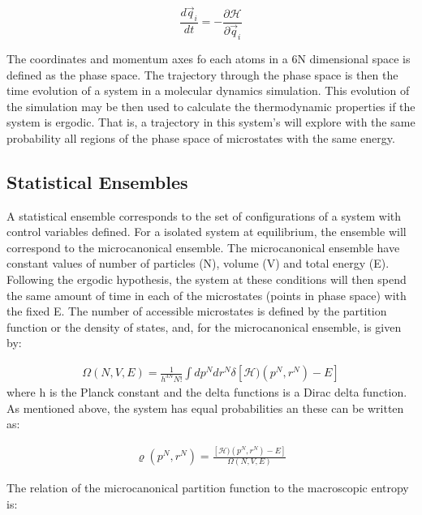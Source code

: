 \begin{equation}
\frac{d \vec{q}_{i}}{dt} = - \frac{\partial \mathcal{H}}{\partial \vec{q}_{i}}
\end{equation}

The coordinates and momentum axes fo each atoms in a 6N dimensional space is defined as the phase space. The trajectory through the phase space is then the time evolution of a system in a molecular dynamics simulation. This evolution of the simulation may be then used to calculate the thermodynamic properties if the system is ergodic. That is, a trajectory in this system's will explore with the same probability all regions of the phase space of microstates with the same energy. 

\subsection{Statistical Ensembles}

A statistical ensemble corresponds to the set of configurations of a system with control variables defined. For a isolated system at equilibrium, the ensemble will correspond  to the microcanonical ensemble. The microcanonical ensemble have constant values of  number of particles (N), volume (V) and total energy (E). Following the ergodic hypothesis, the system at these conditions will then spend the same amount of time in each of the microstates (points in phase space) with the fixed E.  The number of accessible microstates is defined by the partition function or the density of states, and, for the microcanonical ensemble, is given by: 

\begin{equation}
\begin{aligned}
 \Omega (N,V,E) = \frac{1}{h^{3N}N!} \int dp^{N} dr^{N} \delta [\mathcal{H})(p^{N},r^{N}) -E]
\end{aligned}
\end{equation}
where h is the Planck constant and the delta functions is a Dirac delta function. As mentioned above, the system has equal probabilities an these can be written as:

\begin{equation}
\begin{aligned}
\varrho (p^{N},r^{N}) = \frac{[\mathcal{H})(p^{N},r^{N}) -E]}{ \Omega (N,V,E)} 
\end{aligned}
\end{equation}

The relation of the microcanonical partition function to the macroscopic entropy is:

